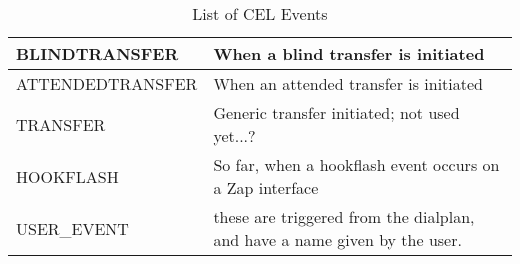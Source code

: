 \begin{table}[h]
\begin{tabular}{ | l | p{10cm} | }
    BLINDTRANSFER    & When a blind transfer is initiated                                        \\ \hline
    ATTENDEDTRANSFER & When an attended transfer is initiated                                    \\ \hline
    TRANSFER         & Generic transfer initiated; not used yet...?                              \\ \hline
    HOOKFLASH        & So far, when a hookflash event occurs on a Zap interface                  \\ \hline
    USER\_EVENT      & these are triggered from the dialplan, and have a name given by the user. \\
    \hline
  \end{tabular}
  \caption{List of CEL Events}
  \label{event-table}
\end{table}

